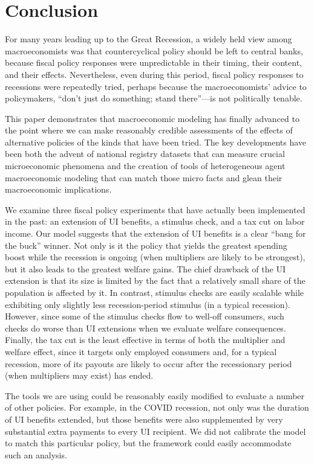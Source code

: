 \documentclass[\econtexRoot/IneqMeas]{subfiles}
\begin{document}
\section{Conclusion}

For many years leading up to the Great Recession, a widely held view among macroeconomists was that countercyclical policy should be left to central banks, because fiscal policy responses were unpredictable in their timing, their content, and their effects.  Nevertheless, even during this period, fiscal policy responses to recessions were repeatedly tried, perhaps because the macroeconomists' advice to policymakers, ``don't just do something; stand there''---is not politically tenable.

This paper demonstrates that macroeconomic modeling has finally advanced to the point where we can make reasonably credible assessments of the effects of alternative policies of the kinds that have been tried.  The key developments have been both the advent of national registry datasets that can measure crucial microeconomic phenomena and the creation of tools of heterogeneous agent macroeconomic modeling that can match those micro facts and glean their macroeconomic implications.

We examine three fiscal policy experiments that have actually been implemented in the past: an extension of UI benefits, a stimulus check, and a tax cut on labor income.  Our model suggests that the extension of UI benefits is a clear ``bang for the buck'' winner.  Not only is it the policy that yields the greatest spending boost while the recession is ongoing (when multipliers are likely to be strongest), but it also leads to the greatest welfare gains. The chief drawback of the UI extension is that its size is limited by the fact that a relatively small share of the population is affected by it. In contrast, stimulus checks are easily scalable while exhibiting only slightly less recession-period stimulus (in a typical recession). However, since some of the stimulus checks flow to well-off consumers, such checks do worse than UI extensions when we evaluate welfare consequences. Finally, the tax cut is the least effective in terms of both the multiplier and welfare effect, since it targets only employed consumers and, for a typical recession, more of its payouts are likely to occur after the recessionary period (when multipliers may exist) has ended.

The tools we are using could be reasonably easily modified to evaluate a number of other policies.  For example, in the COVID recession, not only was the duration of UI benefits extended, but those benefits were also supplemented by very substantial extra payments to every UI recipient.  We did not calibrate the model to match this particular policy, but the framework could easily accommodate such an analysis.
\end{document}
